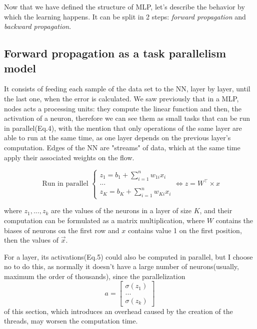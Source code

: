 \documentclass{article}
\begin{document}
Now that we have defined the structure of MLP, let's describe the behavior by which the learning happens. It can be split in 2 steps: \textit{forward propagation} and \textit{backward propagation}.\\



\subsection{Forward propagation as a task parallelism model}
It consists of feeding each sample of the data set to the NN, layer by layer, until the last one, when the error is calculated. We saw previously that in a MLP, nodes acts a processing units: they compute the linear function and then, the activation of a neuron, therefore we can see them as small tasks that can be run in parallel(Eq.4), with the mention that only operations of the same layer are able to run at the same time, as one layer depends on the previous layer's computation. Edges of the NN are "streams" of data, which at the same time apply their associated weights on the flow.

\begin{equation}
\text{	Run in parallel }
	\begin{cases}
		z_1 = b_1 + \sum_{i=1}^{n}w_{1i}x_i \\
		...\\
		z_K = b_K + \sum_{i=1}^{n}w_{Ki}x_i 
	\end{cases}       
\iff z = W^\top \times x	
\end{equation}

where $z_1, ..., z_k$ are the values of the neurons in a layer of size $K$, and their computation can be formulated as a matrix multiplication, where $W$ contains the biases of neurons on the first row and $x$ contains value 1 on the first position, then the values of $\vec{x}$.

For a layer, its activations(Eq.5) could also be computed in parallel, but I choose no to do this, as normally it doesn't have a large number of 
neurons(usually, maximum the order of thousands), since the parallelization
\begin{equation}
	a = 
	\begin{bmatrix}
		\sigma(z_1)  \\
		...  \\
		\sigma(z_k)
	\end{bmatrix}
\end{equation} of this section, which introduces an overhead caused by the creation of the threads, may worsen the computation time. 
\end{document}
